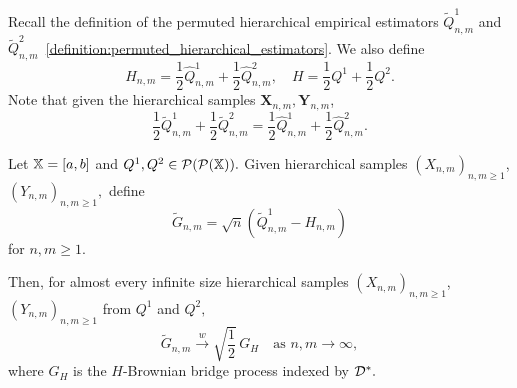 Recall the definition of the permuted hierarchical empirical estimators $\widetilde{Q}^1_{n,m}$ and $\widetilde{Q}^2_{n,m}$~\eqref{definition:permuted_hierarchical_estimators}. We also define
\[
H_{n,m} = \frac{1}{2}\widehat{Q}^1_{n,m} + \frac{1}{2}\widehat{Q}^2_{n,m}, \quad  
H = \frac{1}{2}Q^1 + \frac{1}{2}Q^2.
\]
Note that given the hierarchical samples $\mathbf{X}_{n,m}, \mathbf{Y}_{n,m}$,
\[
\frac{1}{2}\widetilde{Q}^1_{n,m} + \frac{1}{2}\widetilde{Q}^2_{n,m} = \frac{1}{2}\widehat{Q}^1_{n,m} + \frac{1}{2}\widehat{Q}^2_{n,m}.
\]
\begin{theorem}\label{theorem::asympt_distr_perm_emp_process}
Let $\mathbb{X} = [a,b]$ and $Q^1,Q^2 \in \mathcal{P}(\mathcal{P}(\mathbb{X})).$ Given hierarchical samples $(X_{n,m})_{n,m\geq 1}$,$(Y_{n,m})_{n,m\geq 1},$ define
\[
\widetilde{G}_{n,m} = \sqrt{n}(\widetilde{Q}^1_{n,m} - H_{n,m})
\]
for $n,m \geq 1.$

Then, for almost every infinite size hierarchical samples $(X_{n,m})_{n,m\geq 1}$,$(Y_{n,m})_{n,m\geq 1}$ from $Q^1$ and $Q^2,$
\[
\widetilde{G}_{n,m} \overset{w}{\to}\sqrt{\frac{1}{2}}\,G_H \quad \text{as } n,m\to\infty,
\]
where $G_H$ is the $H$-Brownian bridge process indexed by $\mathcal{D}^*.$
\end{theorem}
